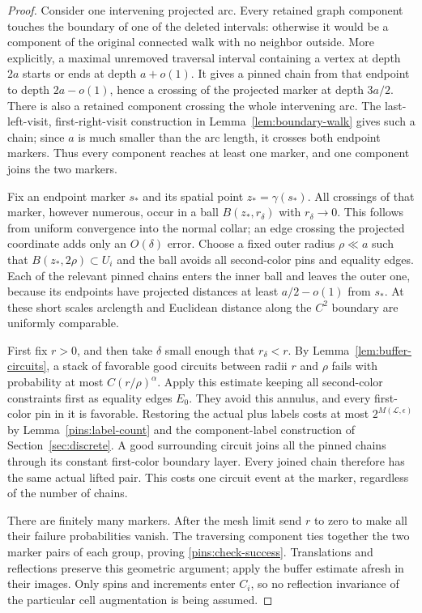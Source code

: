 \documentclass[11pt]{article}
\theoremstyle{definition}
\theoremstyle{remark}
\numberwithin{equation}{section}
\begin{document}
\begin{proof}
Consider one intervening projected arc.  Every retained graph component
touches the boundary of one of the deleted intervals: otherwise it would
be a component of the original connected walk with no neighbor outside.
More explicitly, a maximal unremoved traversal interval containing a
vertex at depth $2a$ starts or ends at depth $a+o(1)$.  It gives a
pinned chain from that endpoint to depth $2a-o(1)$, hence a crossing
of the projected marker at depth $3a/2$.  There is also a retained
component crossing the whole intervening arc.  The last-left-visit,
first-right-visit construction in Lemma~\ref{lem:boundary-walk} gives
such a chain; since $a$ is much smaller than the arc length, it crosses
both endpoint markers.  Thus every component reaches at least one
marker, and one component joins the two markers.

Fix an endpoint marker $s_*$ and its spatial point $z_* =\gamma(s_*)$.
All crossings of that marker, however numerous, occur in a ball
$B(z_*,r_\delta)$ with $r_\delta\to0$.  This follows from uniform
convergence into the normal collar; an edge crossing the projected
coordinate adds only an $O(\delta)$ error.  Choose a fixed outer radius
$\rho\ll a$ such that $B(z_*,2\rho)\subset U_i$ and the ball avoids
all second-color pins and equality edges.  Each of the relevant pinned
chains enters the inner ball and leaves the outer one, because its
endpoints have projected distances at least $a/2-o(1)$ from $s_*$.
At these short scales arclength and Euclidean distance along the
$C^2$ boundary are uniformly comparable.

First fix $r>0$, and then take $\delta$ small enough that $r_\delta<r$.
By Lemma~\ref{lem:buffer-circuits}, a stack of favorable good circuits
between radii $r$ and $\rho$ fails with probability at most
$C(r/\rho)^\alpha$.  Apply this estimate keeping all second-color
constraints first as equality edges $E_0$.  They avoid this annulus,
and every first-color pin in it is favorable.  Restoring the actual
plus labels costs at most $2^{M(\mathcal L,\epsilon)}$ by
Lemma~\ref{pins:label-count} and the component-label construction of
Section~\ref{sec:discrete}.  A good surrounding circuit joins all the
pinned chains through its constant first-color boundary layer.  Every
joined chain therefore has the same actual lifted pair.  This costs
one circuit event at the marker, regardless of the number of chains.

There are finitely many markers.  After the mesh limit send $r$ to
zero to make all their failure probabilities vanish.  The traversing
component ties together the two marker pairs of each group, proving
\eqref{pins:check-success}.  Translations and reflections preserve this
geometric argument; apply the buffer estimate afresh in their images.
Only spins and increments enter $C_i$, so no reflection invariance of
the particular cell augmentation is being assumed.
\end{proof}
\end{document}
